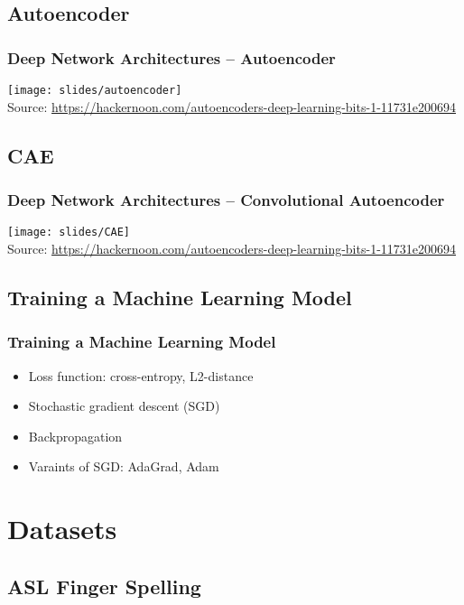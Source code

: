 \subsection{Autoencoder}

\begin{frame}
\frametitle{Deep Network Architectures -- Autoencoder}
  \texttt{[image: slides/autoencoder]}\\
  \vspace*{1em}
  Source:
    \href{https://hackernoon.com/autoencoders-deep-learning-bits-1-11731e200694}
    {https://hackernoon.com/autoencoders-deep-learning-bits-1-11731e200694}
\end{frame}

\subsection{CAE}

\begin{frame}
\frametitle{Deep Network Architectures -- Convolutional Autoencoder}
  \texttt{[image: slides/CAE]}\\
  \vspace*{1em}
  Source:
    \href{https://hackernoon.com/autoencoders-deep-learning-bits-1-11731e200694}
    {https://hackernoon.com/autoencoders-deep-learning-bits-1-11731e200694}
\end{frame}

\subsection{Training a Machine Learning Model}

\begin{frame}
\frametitle{Training a Machine Learning Model}
  \begin{itemize}
    \item Loss function: cross-entropy, L2-distance
    \item Stochastic gradient descent (SGD)
    \item Backpropagation
    \item Varaints of SGD: AdaGrad, Adam
  \end{itemize}
\end{frame}

\section{Datasets}

\subsection{ASL Finger Spelling}

